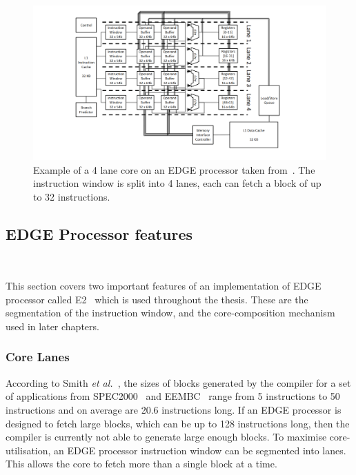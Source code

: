  \begin{figure}[t]
 \center
 \includegraphics[width=1\textwidth]{background/graphics/edge_lanes.pdf}
 \vspace{-4em}
 \caption{Example of a 4 lane core on an EDGE processor taken from~\cite{putnam2010e2}. The instruction window is split into 4 lanes, each can fetch a block of up to 32 instructions.}\label{fig:e2segment}
\vspace{-1em}
 \end{figure}

\subsection{EDGE Processor features}~\label{sec:edge_arch}

This section covers two important features of an implementation of EDGE processor called E2~\cite{putnam2010e2} which is used throughout the thesis.
These are the segmentation of the instruction window, and the core-composition mechanism used in later chapters.

\subsubsection{Core Lanes} 

According to Smith {\it et al.~}\cite{smith2006edge}, the sizes of blocks generated by the compiler for a set of applications from SPEC2000~\cite{spec2000} and EEMBC~\cite{eembc} range from 5 instructions to 50 instructions and on average are 20.6 instructions long.
If an EDGE processor is designed to fetch large blocks, which can be up to 128 instructions long, then the compiler is currently not able to generate large enough blocks.
To maximise core-utilisation, an EDGE processor instruction window can be segmented into lanes.
This allows the core to fetch more than a single block at a time.

